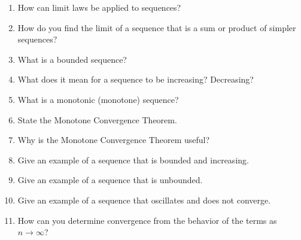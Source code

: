 \begin{enumerate}
\begin{itemize}
      \item $r = 1$?
      \item $r > 1$?
    \end{itemize}
  \item How can limit laws be applied to sequences?
  \item How do you find the limit of a sequence that is a sum or product of simpler sequences?
  \item What is a bounded sequence?
  \item What does it mean for a sequence to be increasing? Decreasing?
  \item What is a monotonic (monotone) sequence?
  \item State the Monotone Convergence Theorem.
  \item Why is the Monotone Convergence Theorem useful?
  \item Give an example of a sequence that is bounded and increasing.
  \item Give an example of a sequence that is unbounded.
  \item Give an example of a sequence that oscillates and does not converge.
  \item How can you determine convergence from the behavior of the terms as $n \to \infty$?
\end{enumerate}

